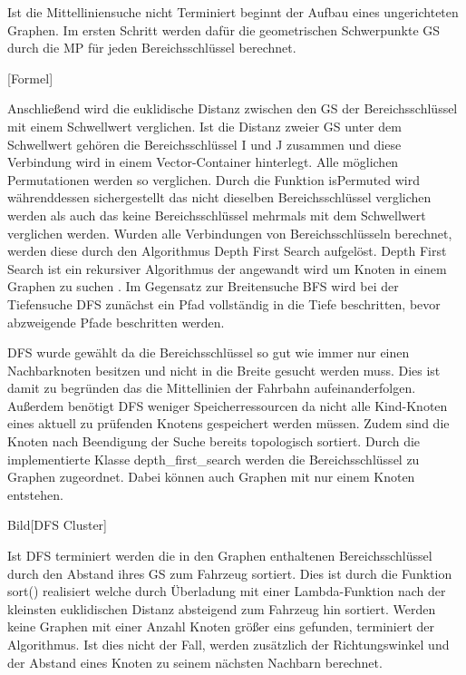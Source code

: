 Ist die Mittelliniensuche nicht Terminiert beginnt der Aufbau eines ungerichteten Graphen.
Im ersten Schritt werden daf{\"u}r die geometrischen Schwerpunkte GS durch die MP f{\"u}r jeden Bereichsschl{\"u}ssel berechnet.

[Formel]

Anschlie{\ss}end wird die euklidische Distanz zwischen den GS der Bereichsschl{\"u}ssel mit einem Schwellwert verglichen. Ist die Distanz zweier GS unter dem Schwellwert geh{\"o}ren die Bereichsschl{\"u}ssel I und J zusammen und diese Verbindung wird in einem Vector-Container hinterlegt.  
Alle m{\"o}glichen Permutationen werden so verglichen. Durch die Funktion isPermuted wird w{\"a}hrenddessen sichergestellt das nicht dieselben Bereichsschl{\"u}ssel verglichen werden als auch das keine Bereichsschl{\"u}ssel mehrmals mit dem Schwellwert verglichen werden.
Wurden alle Verbindungen von Bereichsschl{\"u}sseln berechnet, werden diese durch den Algorithmus Depth First Search aufgel{\"o}st. Depth First Search ist ein rekursiver Algorithmus der angewandt wird um  Knoten in einem Graphen zu suchen . Im Gegensatz zur Breitensuche BFS wird bei der Tiefensuche DFS zun{\"a}chst ein Pfad vollst{\"a}ndig in die Tiefe beschritten, bevor abzweigende Pfade beschritten werden.


DFS wurde gew{\"a}hlt da die Bereichsschl{\"u}ssel so gut wie immer nur einen Nachbarknoten besitzen und nicht in die Breite gesucht werden muss. Dies ist damit zu begr{\"u}nden das die Mittellinien der Fahrbahn aufeinanderfolgen. Au{\ss}erdem ben{\"o}tigt DFS weniger Speicherressourcen da nicht alle Kind-Knoten eines aktuell zu pr{\"u}fenden Knotens gespeichert werden m{\"u}ssen. Zudem sind die Knoten nach Beendigung der Suche bereits topologisch sortiert. Durch die implementierte Klasse depth\_first\_search werden die Bereichsschl{\"u}ssel zu Graphen zugeordnet. Dabei k{\"o}nnen auch Graphen mit nur einem Knoten entstehen.

Bild[DFS Cluster]

Ist DFS terminiert werden die in den Graphen enthaltenen Bereichsschl{\"u}ssel durch den Abstand ihres GS zum Fahrzeug sortiert. Dies ist durch die Funktion sort() realisiert welche durch {\"U}berladung mit einer Lambda-Funktion nach der kleinsten euklidischen Distanz absteigend zum Fahrzeug hin sortiert. Werden keine Graphen mit einer Anzahl Knoten gr{\"o}{\ss}er eins gefunden, terminiert der Algorithmus. Ist dies nicht der Fall, werden zus{\"a}tzlich der Richtungswinkel und der Abstand eines Knoten zu seinem n{\"a}chsten Nachbarn berechnet.

